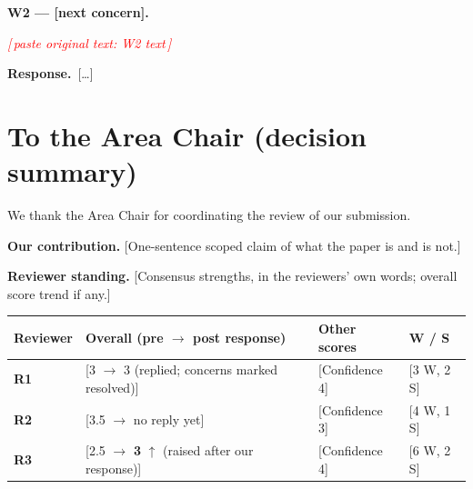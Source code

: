 \documentclass[11pt]{article}
\newcommand{\rA}{\textcolor{cRA}{\textbf{R1}}}
\newcommand{\rB}{\textcolor{cRB}{\textbf{R2}}}
\newcommand{\rC}{\textcolor{cRC}{\textbf{R3}}}
\newcommand{\Rtodo}[1]{\begin{rquotebox}\small\itshape\textcolor{red}{[\,paste
original text: #1\,]}\end{rquotebox}}
\newcommand{\Resp}{\textbf{Response.}\ }
\newcommand{\point}[1]{\smallskip\noindent\textbf{#1}\ }
\begin{document}
\point{W2 --- [next concern].}
\Rtodo{W2 text}
\Resp [\ldots]


\section{To the Area Chair \normalfont(decision summary)}
We thank the Area Chair for coordinating the review of our submission.

\textbf{Our contribution.} [One-sentence scoped claim of what the paper is
and is not.]

\textbf{Reviewer standing.} [Consensus strengths, in the reviewers' own
words; overall score trend if any.]

\begin{center}\footnotesize
\setlength{\tabcolsep}{5pt}\renewcommand{\arraystretch}{1.15}
\begin{tabular}{@{}llll@{}}
\toprule
Reviewer & Overall (pre $\to$ post response) & Other scores & W / S \\
\midrule
\rA{} & [3 $\to$ 3 (replied; concerns marked resolved)] & [Confidence 4] & [3 W, 2 S] \\
\rB{} & [3.5 $\to$ no reply yet] & [Confidence 3] & [4 W, 1 S] \\
\rC{} & [2.5 $\to$ \textbf{3} $\uparrow$ (raised after our response)] & [Confidence 4] & [6 W, 2 S] \\
\bottomrule
\end{tabular}
\end{center}
\end{document}
